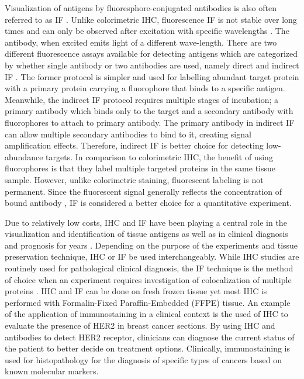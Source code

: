 Visualization of antigens by fluoresphore-conjugated antibodies is also often referred to as IF \cite{joshi2017immunofluorescence}. Unlike colorimetric IHC, fluorescence IF is not stable over long times and can only be observed after excitation with specific wavelengths \cite{corthell2014basic}. The antibody, when excited emits light of a different wave-length. There are two different fluorescence assays available for detecting antigens which are categorized by whether single antibody or two antibodies are used, namely direct and indirect IF \cite{JOSHI2017135}. The former protocol is simpler and used for labelling abundant target protein with a primary protein carrying a fluorophore that binds to a specific antigen. Meanwhile, the indirect IF protocol requires multiple stages of incubation; a primary antibody which binds only to the target and a secondary antibody with fluorophores to attach to primary antibody. The primary antibody in indirect IF can allow multiple secondary antibodies to bind to it, creating signal amplification effects. Therefore, indirect IF is better choice for detecting low-abundance targets. In comparison to colorimetric IHC, the benefit of using fluorophores is that they label multiple targeted proteins in the same tissue sample. However, unlike colorimetric staining, fluorescent labeling is not permanent. Since the fluorescent signal generally reflects the concentration of bound antibody \cite{dabbs2017diagnostic}, IF is considered a better choice for a quantitative experiment.

Due to relatively low costs, IHC and IF have been playing a central role in the visualization and identification of tissue antigens as well as in clinical diagnosis and prognosis for years \cite{ducheyne2015comprehensive, rupprecht2015current}. Depending on the purpose of the experiments and tissue preservation technique, IHC or IF be used interchangeably. While IHC studies are routinely used for pathological clinical diagnosis, the IF technique is the method of choice when an experiment requires investigation of colocalization of multiple proteins \cite{joshi2017immunofluorescence}. IHC and IF can be done on fresh frozen tissue yet most IHC is performed with Formalin-Fixed Paraffin-Embedded (FFPE) tissue. An example of the application of immunostaining in a clinical context is the used of IHC to evaluate the presence of HER2 in breast cancer sections. By using IHC and antibodies to detect HER2 receptor, clinicians can diagnose the current status of the patient to better decide on treatment options. Clinically, immunostaining is used for histopathology for the diagnosis of specific types of cancers based on known molecular markers.  

